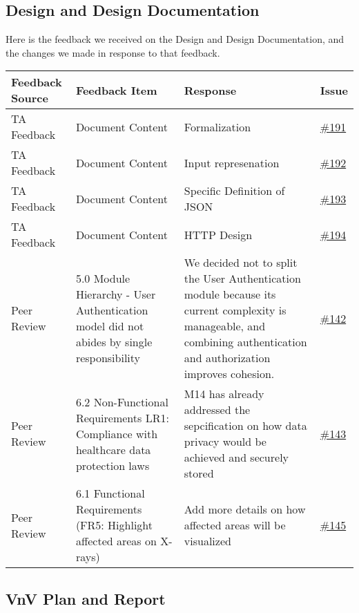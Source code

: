 \documentclass{article}
\begin{document}
\subsection{Design and Design Documentation}

Here is the feedback we received on the Design and Design Documentation, and the changes we made in response to that feedback.
\begin{longtable}{| p{} | p{} | p{} | p{} |}
\hline
\textbf{Feedback Source} & \textbf{Feedback Item} & \textbf{Response} & \textbf{Issue} \\
\hline
TA Feedback & Document Content & Formalization  & \href{https://github.com/RezaJodeiri/CXR-Capstone/issues/191}{\#191} \\
\hline
TA Feedback & Document Content & Input represenation & \href{https://github.com/RezaJodeiri/CXR-Capstone/issues/192}{\#192} \\
\hline
TA Feedback & Document Content & Specific Definition of JSON & \href{https://github.com/RezaJodeiri/CXR-Capstone/issues/193}{\#193} \\
\hline
TA Feedback & Document Content & HTTP Design & \href{https://github.com/RezaJodeiri/CXR-Capstone/issues/194}{\#194} \\
\hline
Peer Review & 5.0 Module Hierarchy - User Authentication model did not abides by single responsibility & We decided not to split the User Authentication module because its current complexity is manageable, and combining authentication and authorization improves cohesion. &\href{https://github.com/RezaJodeiri/CXR-Capstone/issues/142}{\#142}\\
\hline
Peer Review & 6.2 Non-Functional Requirements LR1: Compliance with healthcare data protection laws & M14 has already addressed the sepcification on how data privacy would be achieved and securely stored & \href{https://github.com/RezaJodeiri/CXR-Capstone/issues/143}{\#143}\\
\hline
Peer Review & 6.1 Functional Requirements (FR5: Highlight affected areas on X-rays) & Add more details on how affected areas will be visualized & \href{https://github.com/RezaJodeiri/CXR-Capstone/issues/145}{\#145}
\hline
\end{longtable}

\subsection{VnV Plan and Report}
\end{document}
